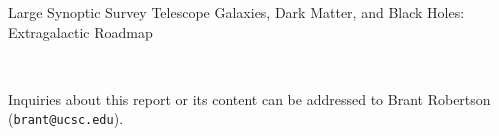 \documentclass[11pt,fleqn]{book} %
\begin{document}

\begingroup
\thispagestyle{empty}
{\Huge Large Synoptic Survey Telescope} 
\linebreak 
\linebreak 
{\Huge Galaxies, Dark Matter, and Black Holes: Extragalactic Roadmap}
\linebreak
\linebreak
{\centering


}
\vfill
\endgroup

\newpage
\thispagestyle{empty}
\noindent
\noindent
\noindent
\\
\noindent

Inquiries about this report or its content can be addressed to Brant Robertson ({\tt brant@ucsc.edu}).



\end{document}
